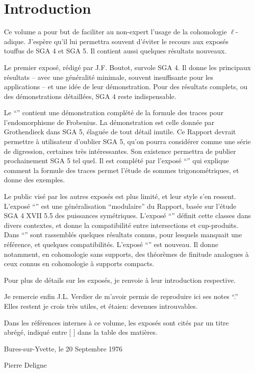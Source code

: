 
\chapter*{Introduction}

Ce volume a pour but de faciliter au non-expert l'usage de la 
cohomologie $\ell$-adique. J'espère qu'il lui permettra souvent d'éviter le 
recours aux exposés touffus de SGA 4 et SGA 5. Il contient aussi quelques 
résultats nouveaux. 

Le premier exposé, rédigé par J.F. Boutot, survole SGA 4. Il donne les 
principaux résultats -- avec une généralité minimale, souvent 
insuffisante pour les applications -- et une idée de leur démonstration. Pour 
des résultats complets, ou des démonstrations détaillées, SGA 4 reste 
indispensable. 

Le ``'' contient une démonstration complété de 
la formule des traces pour l'endomorphisme de Frobenius. La démonstration est 
celle donnée par Grothendieck dans SGA 5, élaguée de tout détail inutile. Ce 
Rapport devrait permettre à utilisateur d'oublier SGA 5, qu'on pourra 
considérer comme une série de digression, certaines très intéressantes. Son 
existence permettra de publier prochainement SGA 5 tel quel. Il est complété 
par l'exposé ``'' qui explique comment la formule des traces permet 
l'étude de sommes trigonométriques, et donne des exemples. 

Le public visé par les autres exposés est plus limité, et leur style s'en 
ressent. L'exposé ``'' est une 
généralisation ``modulaire'' du Rapport, basée sur l'étude SGA 4 XVII 5.5 des 
puissances symétriques. L'exposé ``'' 
définit cette classes dans divers contextes, et donne la compatibilité 
entre intersections et cup-produits. Dans ``'' sont rassemblés 
quelques résultats connus, pour lesquels manquait une référence, et quelques 
compatibilités. L'exposé ``'' 
est nouveau. Il donne notamment, en cohomologie sans supports, des théorèmes de 
finitude analogues à ceux connus en cohomologie à supports compacts. 

Pour plus de détails sur les exposés, je renvoie à leur introduction 
respective. 

Je remercie enfin J.L. Verdier de m'avoir permis de reproduire ici ses notes 
``.'' Elles restent je crois très utiles, et 
étaien: devenues introuvables. 

Dans les références internes à ce volume, les exposés sont cités par 
un titre abrégé, indiqué entre [ ] dans la table des matières. 

\vspace{20pt}
Bures-sur-Yvette, le 20 Septembre 1976

\vspace{5pt}
Pierre Deligne